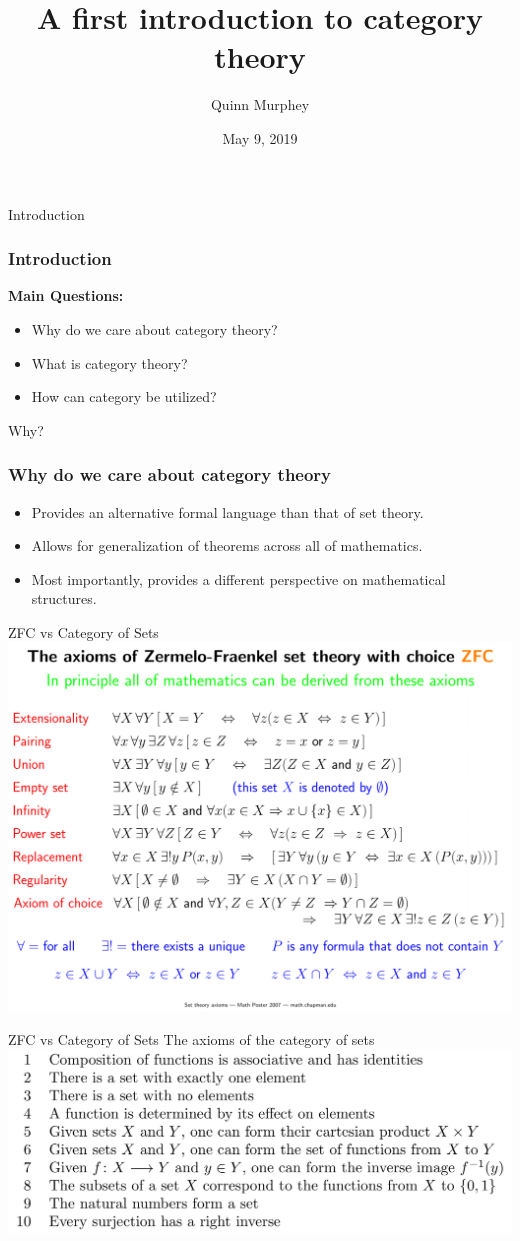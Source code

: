 \documentclass[12pt]{beamer}
\title[Category Theory]{A first introduction to category theory}
\author[Quinn Murphey]{Quinn Murphey}
\date[]{May 9, 2019}
\begin{document}
 
\frame{\titlepage}

\begin{frame}{Introduction}
    \frametitle{Introduction}
    \textbf{Main Questions:}
    \begin{itemize}
        \item Why do we care about category theory?
        \item What is category theory?
        \item How can category be utilized?
    \end{itemize}
\end{frame}

\begin{frame}{Why?}
    \frametitle{Why do we care about category theory}
    \begin{itemize}
        \item Provides an alternative formal language than that of set theory.
        \item Allows for generalization of theorems across all of mathematics.
        \item Most importantly, provides a different perspective on mathematical structures.
    \end{itemize}
\end{frame}

\begin{frame}{ZFC vs Category of Sets}
    \center\includegraphics[width=.8\linewidth]{Presentations/ZFC.png}
\end{frame}

\begin{frame}{ZFC vs Category of Sets}
    The axioms of the category of sets
    \center\includegraphics[width=\linewidth]{Presentations/CoS.png}
\end{frame}
\end{document}
